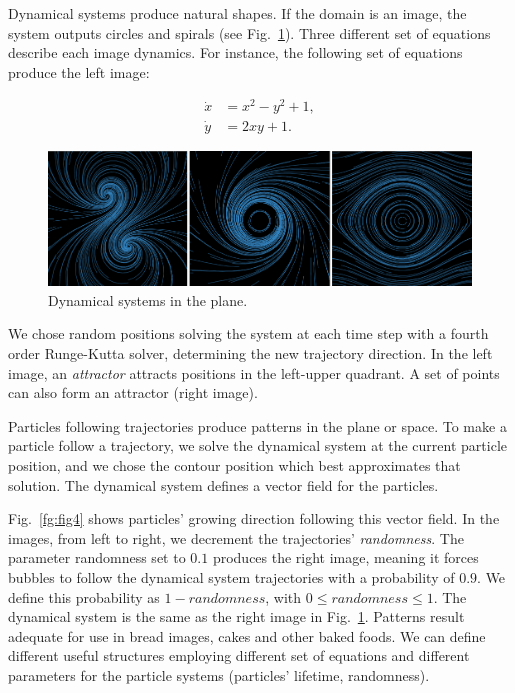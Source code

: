 \documentclass[oneside,a4paper,english,links]{amca}
\begin{document}
Dynamical systems produce natural shapes. If the domain is an image, the system outputs circles and spirals (see
Fig.~\ref{fg:fig3}). Three different set of equations
describe each image dynamics. For instance, the following set of equations produce the left
image:

\begin{equation} \label{eq:simple}  
  \begin{aligned}
    \dot{x} &= x^{2}-y^{2}+1,\\
    \dot{y} &= 2xy+1.
  \end{aligned}
\end{equation}


\begin{figure}[htb!]
  \centerline{\includegraphics[scale=0.28]{fig3}}
  \caption{Dynamical systems in the plane.}
  \label{fg:fig3}
\end{figure}


We chose random positions solving the system at each time step with a fourth order Runge-Kutta solver, determining the new trajectory direction. In the left image, an {\em attractor} attracts positions in the left-upper quadrant. A set of points can also form an attractor (right image).

Particles following trajectories produce patterns in the plane or space. To make a particle follow a trajectory, we solve the dynamical system at the current particle position, and we chose the contour position which best approximates that solution. The dynamical system defines a vector field for the particles.

Fig.~\ref{fg:fig4} shows particles' growing direction following this vector field. In the
images, from left to right, we decrement the trajectories' {\em randomness}. The parameter randomness set to $0.1$ produces the right image, meaning
it forces bubbles to follow the dynamical system
trajectories with a probability of $0.9$. We define this probability as
$1-randomness$, with $0 \leq randomness \leq 1$. The dynamical system
is the same as the right image in Fig.~\ref{fg:fig3}.  Patterns result adequate for use in bread images, cakes and other baked foods. We can define different useful structures employing different set of equations and different parameters for the
particle systems (particles' lifetime, randomness).
\end{document}
